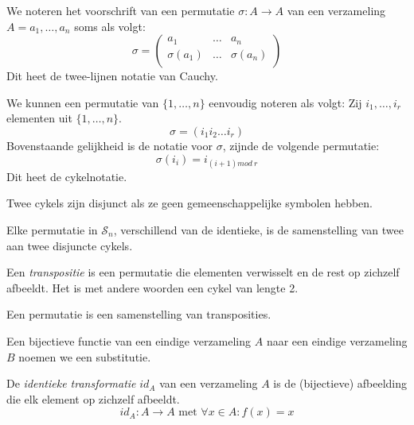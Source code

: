 \documentclass[main.tex]{subfiles}
\begin{document}
\begin{de}
  We noteren het voorschrift van een permutatie $\sigma: A\rightarrow A$ van een verzameling $A = a_{1},\dotsc,a_{n}$ soms als volgt:
  \[
  \sigma = 
  \begin{pmatrix}
    a_{1}         & \hdots & a_{n}         \\
    \sigma(a_{1}) & \hdots & \sigma(a_{n}) \\
  \end{pmatrix}
  \]
  Dit heet de twee-lijnen notatie van Cauchy.
\end{de}

\begin{de}
  We kunnen een permutatie van $\{1,\dotsc,n\}$ eenvoudig noteren als volgt:
  Zij $i_{1},\dotsc,i_{r}$ elementen uit $\{1,\dotsc,n\}$.
  \[ \sigma = (i_{1}i_{2}\dotsc i_{r}) \]
  Bovenstaande gelijkheid is de notatie voor $\sigma$, zijnde de volgende permutatie:
  \[ \sigma(i_{i}) = i_{(i+1) mod\ r} \]
  Dit heet de cykelnotatie.
\end{de}

\begin{de}
  Twee cykels zijn disjunct als ze geen gemeenschappelijke symbolen hebben. 
\end{de}

\begin{st}
  Elke permutatie in $\mathcal{S}_{n}$, verschillend van de identieke, is de samenstelling van twee aan twee disjuncte cykels.

\end{st}

\begin{de}
  Een \emph{transpositie} is een permutatie die elementen verwisselt en de rest op zichzelf afbeeldt.
  Het is met andere woorden een cykel van lengte 2.
\end{de}

\begin{st}
  Een permutatie is een samenstelling van transposities.

\end{st}

\begin{de}
  Een bijectieve functie van een eindige verzameling $A$ naar een eindige verzameling $B$ noemen we een substitutie. 
\end{de}

\begin{de}
  \label{identieke-transformatie}
  De \emph{identieke transformatie} $id_{A}$ van een verzameling $A$ is de (bijectieve) afbeelding die elk element op zichzelf afbeeldt.
  \[ id_{A}: A \rightarrow A \text{ met } \forall x \in A: f(x) = x \]
\end{de}
\end{document}
